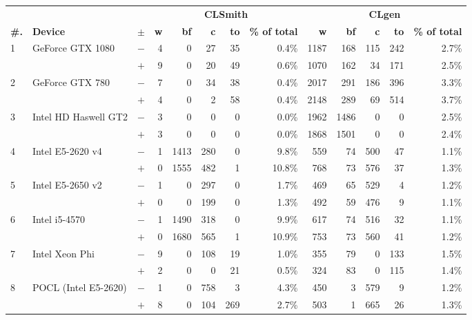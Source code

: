   \begin{tabular}{lll | rrrrr | rrrrr }
  \toprule
  & & & \multicolumn{5}{c|}{\textbf{CLSmith}} & \multicolumn{5}{c}{\textbf{CLgen}} \\
  \textbf{\#.} & \textbf{Device} & $\pm$ &
  \textbf{w} & \textbf{bf} & \textbf{c} & \textbf{to} & \textbf{\% of total} &
  \textbf{w} & \textbf{bf} & \textbf{c} & \textbf{to} & \textbf{\% of total} \\
  \midrule
  \multirow{ 2}{*}{1} & \multirow{ 2}{*}{GeForce GTX 1080} & $-$ & 4 & 0 & 27 & 35 & 0.4\%       & 1187 & 168 & 115 & 242 & 2.7\% \\& & $+$ & 9 & 0 & 20 & 49 & 0.6\% & 1070 & 162 & 34 & 171 & 2.5\% \\
\hline
\multirow{ 2}{*}{2} & \multirow{ 2}{*}{GeForce GTX 780} & $-$ & 7 & 0 & 34 & 38 & 0.4\%       & 2017 & 291 & 186 & 396 & 3.3\% \\& & $+$ & 4 & 0 & 2 & 58 & 0.4\% & 2148 & 289 & 69 & 514 & 3.7\% \\
\hline
\multirow{ 2}{*}{3} & \multirow{ 2}{*}{Intel HD Haswell GT2} & $-$ & 3 & 0 & 0 & 0 & 0.0\%       & 1962 & 1486 & 0 & 0 & 2.5\% \\& & $+$ & 3 & 0 & 0 & 0 & 0.0\% & 1868 & 1501 & 0 & 0 & 2.4\% \\
\hline
\multirow{ 2}{*}{4} & \multirow{ 2}{*}{Intel E5-2620 v4} & $-$ & 1 & 1413 & 280 & 0 & 9.8\%       & 559 & 74 & 500 & 47 & 1.1\% \\& & $+$ & 0 & 1555 & 482 & 1 & 10.8\% & 768 & 73 & 576 & 37 & 1.3\% \\
\hline
\multirow{ 2}{*}{5} & \multirow{ 2}{*}{Intel E5-2650 v2} & $-$ & 1 & 0 & 297 & 0 & 1.7\%       & 469 & 65 & 529 & 4 & 1.2\% \\& & $+$ & 0 & 0 & 199 & 0 & 1.3\% & 492 & 59 & 476 & 9 & 1.1\% \\
\hline
\multirow{ 2}{*}{6} & \multirow{ 2}{*}{Intel i5-4570} & $-$ & 1 & 1490 & 318 & 0 & 9.9\%       & 617 & 74 & 516 & 32 & 1.1\% \\& & $+$ & 0 & 1680 & 565 & 1 & 10.9\% & 753 & 73 & 560 & 41 & 1.2\% \\
\hline
\multirow{ 2}{*}{7} & \multirow{ 2}{*}{Intel Xeon Phi} & $-$ & 9 & 0 & 108 & 19 & 1.0\%       & 355 & 79 & 0 & 133 & 1.5\% \\& & $+$ & 2 & 0 & 0 & 21 & 0.5\% & 324 & 83 & 0 & 115 & 1.4\% \\
\hline
\multirow{ 2}{*}{8} & \multirow{ 2}{*}{POCL (Intel E5-2620)} & $-$ & 1 & 0 & 758 & 3 & 4.3\%       & 450 & 3 & 579 & 9 & 1.2\% \\& & $+$ & 8 & 0 & 104 & 269 & 2.7\% & 503 & 1 & 665 & 26 & 1.3\% \\

\end{tabular}
